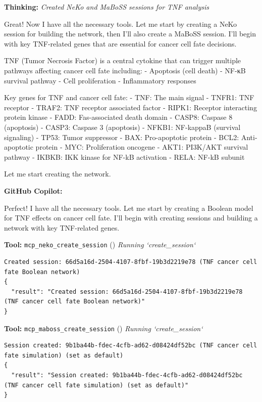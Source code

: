 \documentclass[11pt,a4paper]{article}
\begin{document}
\begin{thinkbox}
\textbf{Thinking:} \textit{Created NeKo and MaBoSS sessions for TNF analysis}

Great! Now I have all the necessary tools. Let me start by creating a NeKo session for building the network, then I'll also create a MaBoSS session. I'll begin with key TNF-related genes that are essential for cancer cell fate decisions.

TNF (Tumor Necrosis Factor) is a central cytokine that can trigger multiple pathways affecting cancer cell fate including:
- Apoptosis (cell death)
- NF-κB survival pathway
- Cell proliferation
- Inflammatory responses

Key genes for TNF and cancer cell fate:
- TNF: The main signal
- TNFR1: TNF receptor
- TRAF2: TNF receptor associated factor
- RIPK1: Receptor interacting protein kinase
- FADD: Fas-associated death domain
- CASP8: Caspase 8 (apoptosis)
- CASP3: Caspase 3 (apoptosis)
- NFKB1: NF-kappaB (survival signaling)
- TP53: Tumor suppressor 
- BAX: Pro-apoptotic protein
- BCL2: Anti-apoptotic protein
- MYC: Proliferation oncogene
- AKT1: PI3K/AKT survival pathway
- IKBKB: IKK kinase for NF-kB activation
- RELA: NF-kB subunit

Let me start creating the network.

\end{thinkbox}
\begin{copilotbox}
\textbf{GitHub Copilot:}

Perfect! I have all the necessary tools. Let me start by creating a Boolean model for TNF effects on cancer cell fate. I'll begin with creating sessions and building a network with key TNF-related genes.

\end{copilotbox}
\begin{toolokbox}
\textbf{Tool:} \texttt{mcp\_neko\_create\_session} (\checkmark)
\textit{Running `create\_session`}
\begin{lstlisting}
Created session: 66d5a16d-2504-4107-8fbf-19b3d2219e78 (TNF cancer cell fate Boolean network)
{
  "result": "Created session: 66d5a16d-2504-4107-8fbf-19b3d2219e78 (TNF cancer cell fate Boolean network)"
}
\end{lstlisting}
\end{toolokbox}
\begin{toolokbox}
\textbf{Tool:} \texttt{mcp\_maboss\_create\_session} (\checkmark)
\textit{Running `create\_session`}
\begin{lstlisting}
Session created: 9b1ba44b-fdec-4cfb-ad62-d08424df52bc (TNF cancer cell fate simulation) (set as default)
{
  "result": "Session created: 9b1ba44b-fdec-4cfb-ad62-d08424df52bc (TNF cancer cell fate simulation) (set as default)"
}
\end{lstlisting}
\end{toolokbox}
\end{document}
